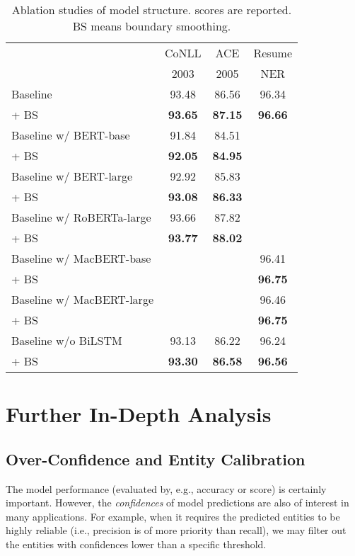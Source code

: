 \documentclass[11pt]{article}
\begin{document}
\begin{table}[t]
    \centering \small
    \begin{tabular}{lccc}
        \toprule
         & CoNLL & ACE  & Resume \\
         & 2003  & 2005 & NER \\
        \midrule
        Baseline                  & 93.48 & 86.56 & 96.34 \\
        \quad + BS                & \textbf{93.65} & \textbf{87.15} & \textbf{96.66} \\
        \midrule
        Baseline w/ BERT-base     & 91.84 & 84.51 & \\
        \quad + BS                & \textbf{92.05} & \textbf{84.95} & \\
        \midrule
        Baseline w/ BERT-large    & 92.92 & 85.83 & \\
        \quad + BS                & \textbf{93.08} & \textbf{86.33} & \\
        \midrule
        Baseline w/ RoBERTa-large & 93.66 & 87.82 & \\
        \quad + BS                & \textbf{93.77} & \textbf{88.02} & \\
        \midrule
        Baseline w/ MacBERT-base  &  &  & 96.41 \\
        \quad + BS                &  &  & \textbf{96.75} \\
        \midrule
        Baseline w/ MacBERT-large &  &  & 96.46 \\
        \quad + BS                &  &  & \textbf{96.75} \\
        \midrule
        Baseline w/o BiLSTM       & 93.13 & 86.22 & 96.24 \\
        \quad + BS                & \textbf{93.30} & \textbf{86.58} & \textbf{96.56} \\
        \bottomrule
    \end{tabular}
    \caption{Ablation studies of model structure.  scores are reported. BS means boundary smoothing.}
    \label{tab:ablation-structure}
\end{table}


\section{Further In-Depth Analysis}
\subsection{Over-Confidence and Entity Calibration}
The model performance (evaluated by, e.g., accuracy or  score) is certainly important. However, the \emph{confidences} of model predictions are also of interest in many applications. For example, when it requires the predicted entities to be highly reliable (i.e., precision is of more priority than recall), we may filter out the entities with confidences lower than a specific threshold. 
\end{document}
